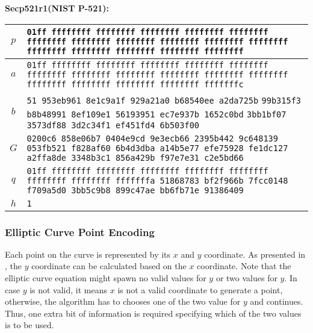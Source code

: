 \textbf{Secp521r1(NIST P-521):}
\begin{center}
\begin{tabular}{|c|p{9.8cm}|} \hline
    $p$ &   \texttt{\phantom{0000}01ff ffffffff ffffffff ffffffff ffffffff ffffffff} \newline
            \texttt{ffffffff ffffffff ffffffff ffffffff ffffffff ffffffff} \newline
            \texttt{ffffffff ffffffff ffffffff ffffffff ffffffff} \\ \hline
    $a$ &   \texttt{\phantom{0000}01ff ffffffff ffffffff ffffffff ffffffff ffffffff} \newline
            \texttt{ffffffff ffffffff ffffffff ffffffff ffffffff ffffffff} \newline
            \texttt{ffffffff ffffffff ffffffff ffffffff fffffffc} \\ \hline
    $b$ &   \texttt{\phantom{000000}51 953eb961 8e1c9a1f 929a21a0 b68540ee a2da725b} \newline
            \texttt{99b315f3 b8b48991 8ef109e1 56193951 ec7e937b 1652c0bd} \newline
            \texttt{3bb1bf07 3573df88 3d2c34f1 ef451fd4 6b503f00} \\ \hline
    $G$ &   \texttt{\phantom{00}0200c6 858e06b7 0404e9cd 9e3ecb66 2395b442 9c648139} \newline
            \texttt{053fb521 f828af60 6b4d3dba a14b5e77 efe75928 fe1dc127} \newline
            \texttt{a2ffa8de 3348b3c1 856a429b f97e7e31 c2e5bd66} \\ \hline
    $q$ &   \texttt{\phantom{0000}01ff ffffffff ffffffff ffffffff ffffffff ffffffff} \newline
            \texttt{ffffffff ffffffff fffffffa 51868783 bf2f966b 7fcc0148} \newline
            \texttt{f709a5d0 3bb5c9b8 899c47ae bb6fb71e 91386409} \\ \hline
    $h$ &   \texttt{1} \\ \hline
\end{tabular}
\end{center}


\subsubsection{Elliptic Curve Point Encoding}
Each point on the curve is represented by its $x$ and $y$ coordinate. As presented in \cite{Trappe05}, the $y$ coordinate can be calculated based on the $x$ coordinate. Note that the elliptic curve equation might spawn no valid values for $y$ or two values for $y$. In case $y$ is not valid, it means $x$ is not a valid coordinate to generate a point, otherwise, the algorithm has to chooses one of the two value for $y$ and continues. Thus, one extra bit of information is required specifying which of the two values is to be used.

